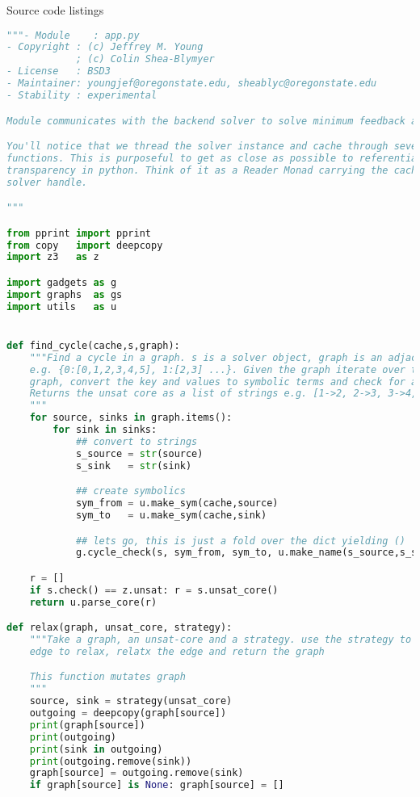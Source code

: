 Source code listings

\begin{lstlisting}[language=python]
"""- Module    : app.py
- Copyright : (c) Jeffrey M. Young
            ; (c) Colin Shea-Blymyer
- License   : BSD3
- Maintainer: youngjef@oregonstate.edu, sheablyc@oregonstate.edu
- Stability : experimental

Module communicates with the backend solver to solve minimum feedback arc set problems

You'll notice that we thread the solver instance and cache through several
functions. This is purposeful to get as close as possible to referential
transparency in python. Think of it as a Reader Monad carrying the cache and
solver handle.

"""

from pprint import pprint
from copy   import deepcopy
import z3   as z

import gadgets as g
import graphs  as gs
import utils   as u


def find_cycle(cache,s,graph):
    """Find a cycle in a graph. s is a solver object, graph is an adjacency list
    e.g. {0:[0,1,2,3,4,5], 1:[2,3] ...}. Given the graph iterate over the
    graph, convert the key and values to symbolic terms and check for a cycle.
    Returns the unsat core as a list of strings e.g. [1->2, 2->3, 3->4, 4->1]
    """
    for source, sinks in graph.items():
        for sink in sinks:
            ## convert to strings
            s_source = str(source)
            s_sink   = str(sink)

            ## create symbolics
            sym_from = u.make_sym(cache,source)
            sym_to   = u.make_sym(cache,sink)

            ## lets go, this is just a fold over the dict yielding ()
            g.cycle_check(s, sym_from, sym_to, u.make_name(s_source,s_sink))

    r = []
    if s.check() == z.unsat: r = s.unsat_core()
    return u.parse_core(r)

def relax(graph, unsat_core, strategy):
    """Take a graph, an unsat-core and a strategy. use the strategy to find the
    edge to relax, relatx the edge and return the graph

    This function mutates graph
    """
    source, sink = strategy(unsat_core)
    outgoing = deepcopy(graph[source])
    print(graph[source])
    print(outgoing)
    print(sink in outgoing)
    print(outgoing.remove(sink))
    graph[source] = outgoing.remove(sink)
    if graph[source] is None: graph[source] = []


\end{lstlisting}
